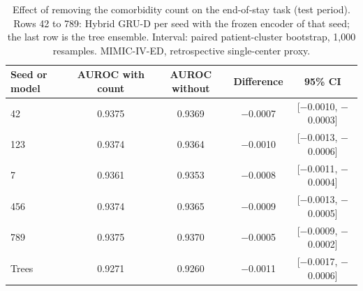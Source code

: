 \begin{table}[t]
\centering
\caption{Effect of removing the comorbidity count on the end-of-stay task (test period). Rows 42 to 789: Hybrid GRU-D per seed with the frozen encoder of that seed; the last row is the tree ensemble. Interval: paired patient-cluster bootstrap, 1{,}000 resamples. MIMIC-IV-ED, retrospective single-center proxy.}
\label{tab:elixhauser}
\begin{tabular}{lcccc}
\toprule
Seed or model & AUROC with count & AUROC without & Difference & 95\% CI \\
\midrule
42 & 0.9375 & 0.9369 & \ensuremath{-}0.0007 & [\ensuremath{-}0.0010, \ensuremath{-}0.0003] \\
123 & 0.9374 & 0.9364 & \ensuremath{-}0.0010 & [\ensuremath{-}0.0013, \ensuremath{-}0.0006] \\
7 & 0.9361 & 0.9353 & \ensuremath{-}0.0008 & [\ensuremath{-}0.0011, \ensuremath{-}0.0004] \\
456 & 0.9374 & 0.9365 & \ensuremath{-}0.0009 & [\ensuremath{-}0.0013, \ensuremath{-}0.0005] \\
789 & 0.9375 & 0.9370 & \ensuremath{-}0.0005 & [\ensuremath{-}0.0009, \ensuremath{-}0.0002] \\
Trees & 0.9271 & 0.9260 & \ensuremath{-}0.0011 & [\ensuremath{-}0.0017, \ensuremath{-}0.0006] \\
\bottomrule
\end{tabular}
\end{table}
